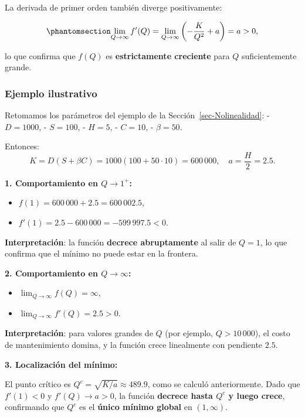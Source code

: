 \documentclass[
  spanish,
  us-letterpaper,
]{scrreprt}
\providecommand{\tightlist}{%
  \setlength{\itemsep}{0pt}\setlength{\parskip}{0pt}}
\numberwithin{equation}{section}
\begin{document}
La derivada de primer orden también diverge positivamente:

\begin{equation}\phantomsection\label{eq-fp_Qinf}{
\lim_{Q \to \infty} f'(Q) = \lim_{Q \to \infty} \left( -\frac{K}{Q^2} + a \right) = a > 0,
}\end{equation}

lo que confirma que \(f(Q)\) es \textbf{estrictamente creciente} para
\(Q\) suficientemente grande.

\subsubsection{Ejemplo ilustrativo}\label{ejemplo-ilustrativo-3}

Retomamos los parámetros del ejemplo de la
Sección~\ref{sec-Nolinealidad}: - \(D = 1000\), - \(S = 100\), -
\(H = 5\), - \(C = 10\), - \(\beta = 50\).

Entonces: \[
K = D(S + \beta C) = 1000(100 + 50 \cdot 10) = 600\,000,
\quad
a = \frac{H}{2} = 2.5.
\]

\textbf{1. Comportamiento en \(Q \to 1^+\):}

\begin{itemize}
\tightlist
\item
  \(f(1) = 600\,000 + 2.5 = 600\,002.5\),
\item
  \(f'(1) = 2.5 - 600\,000 = -599\,997.5 < 0\).
\end{itemize}

\textbf{Interpretación}: la función \textbf{decrece abruptamente} al
salir de \(Q = 1\), lo que confirma que el mínimo no puede estar en la
frontera.

\textbf{2. Comportamiento en \(Q \to \infty\):}

\begin{itemize}
\tightlist
\item
  \(\lim_{Q \to \infty} f(Q) = \infty\),
\item
  \(\lim_{Q \to \infty} f'(Q) = 2.5 > 0\).
\end{itemize}

\textbf{Interpretación}: para valores grandes de \(Q\) (por ejemplo,
\(Q > 10\,000\)), el costo de mantenimiento domina, y la función crece
linealmente con pendiente \(2.5\).

\textbf{3. Localización del mínimo:}

El punto crítico es \(Q^c = \sqrt{K/a} \approx 489.9\), como se calculó
anteriormente. Dado que \(f'(1) < 0\) y \(f'(Q) \to a > 0\), la función
\textbf{decrece hasta \(Q^c\) y luego crece}, confirmando que \(Q^c\) es
el \textbf{único mínimo global} en \((1, \infty)\).
\end{document}
